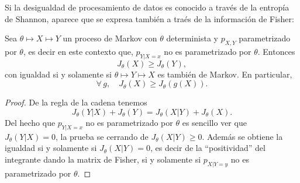 
\label{Ssec:SZ:ProcDatosFisher}

Si  la desigualdad  de  procesamiento de  datos  es conocido  a  trav\'es de  la
entrop\'ia  de  Shannon, aparece  que  se  expresa  tambi\'en  a tra\'es  de  la
informaci\'on de Fisher:

\begin{teorema}
\label{Teo:SZ:DesigualdadProcesamientoDatosFisher}
%
  Sea  $\theta  \mapsto  X  \mapsto   Y$  un  proceso  de  Markov  con  $\theta$
  determinista y $p_{X,Y}$ parametrizado por $\theta$, es decir en este contexto
  que, $p_{Y|X=x}$ no es parametrizado por $\theta$. Entonces
  \[
  J_\theta(X) \ge J_\theta(Y),
  \]
  con igualdad si y solamente si $\theta \mapsto Y \mapsto X$ es tambi\'en
  de Markov. En  particular,
  \[
  \forall \, g, \quad J_\theta(X) \ge J_\theta(g(X)).
  \]
\end{teorema}
%
\begin{proof}
  De la regla de la cadena tenemos
  \[
  J_\theta(Y|X) + J_\theta(Y) = J_\theta(X|Y) + J_\theta(X).
  \]
  Del hecho que $p_{Y|X=x}$ no es parametrizado por $\theta$ es sencillo ver que
  $J_\theta(Y|X) = 0$, la prueba  se cerrando de $J_\theta(X|Y) \ge 0$. Adem\'as
  se obtiene la igualdad  si y solamente si $J_\theta(X|Y) = 0$,  es decir de la
  ``positividad'' del  integrante dando la matrix  de Fisher, si  y solamente si
  $p_{X|Y=y}$ no es parametrizado por $\theta$.
\end{proof}




\label{Ssec:SZ:EPI}

